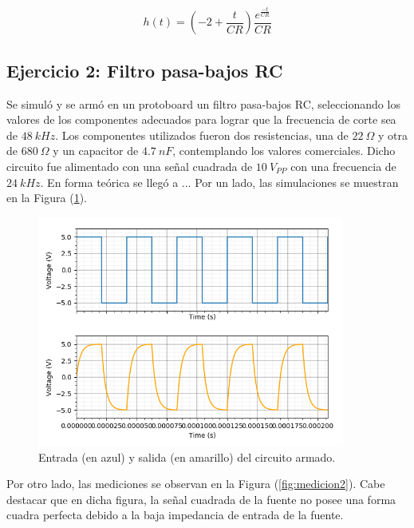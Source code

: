 \documentclass[a4paper]{article}
\begin{document}
\[h(t)=\left( -2 + \frac{t}{CR} \right)\frac{e^{\frac{-t}{CR}}}{CR} \]


\subsection{Ejercicio 2: Filtro pasa-bajos RC}
Se simuló y se armó en un protoboard un filtro pasa-bajos RC, seleccionando los valores de los componentes adecuados para lograr que la frecuencia de corte sea de $ 48 \ kHz $. Los componentes utilizados fueron dos resistencias, una de $22 \ \Omega$ y otra de $680 \ \Omega$ y un capacitor de $4.7 \ nF$, contemplando los valores comerciales.
Dicho circuito fue alimentado con una señal cuadrada de $ 10 \ V_{PP} $ con una frecuencia de $ 24 \ kHz $.
En forma teórica se llegó a ...
Por un lado, las simulaciones se muestran en la Figura (\ref{fig:simu2}).

\begin{figure}[H]
	\centering
	\includegraphics[width=0.9\textwidth]{Entrada-Salida.png}
\caption{Entrada (en azul) y salida (en amarillo) del circuito armado.}
	\label{fig:simu2}
\end{figure}

Por otro lado, las mediciones se observan en la Figura (\ref{fig:medicion2}). Cabe destacar que en dicha figura, la señal cuadrada de la fuente no posee una forma cuadra perfecta debido a la baja impedancia de entrada de la fuente.
\end{document}
